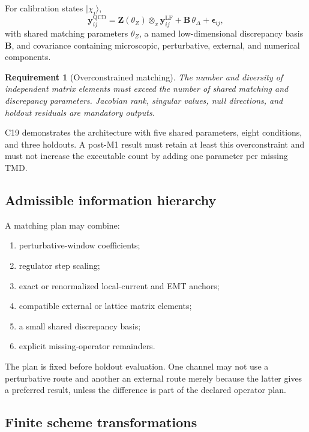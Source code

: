 \documentclass[11pt]{article}
\newtheorem{requirement}[definition]{Requirement}
\newcommand{\LF}{\mathrm{LF}}
\newcommand{\QCD}{\mathrm{QCD}}
\newcommand{\otimesx}{\mathbin{\otimes_x}}
\begin{document}
For calibration states \(|\chi_i\rangle\),
\begin{equation}
 \bm y_{ij}^{\QCD}
 =
 \bm Z(\theta_Z)
 \otimesx
 \bm y_{ij}^{\LF}
 +
 \bm B\,\theta_\Delta
 +
 \bm\epsilon_{ij},
 \label{eq:matching-fit}
\end{equation}
with shared matching parameters \(\theta_Z\), a named low-dimensional discrepancy basis \(\bm B\), and covariance containing microscopic, perturbative, external, and numerical components.

\begin{requirement}[Overconstrained matching]
The number and diversity of independent matrix elements must exceed the number of shared matching and discrepancy parameters.  Jacobian rank, singular values, null directions, and holdout residuals are mandatory outputs.
\end{requirement}

C19 demonstrates the architecture with five shared parameters, eight conditions, and three holdouts.  A post-M1 result must retain at least this overconstraint and must not increase the executable count by adding one parameter per missing TMD.

\subsection{Admissible information hierarchy}

A matching plan may combine:
\begin{enumerate}
\item perturbative-window coefficients;
\item regulator step scaling;
\item exact or renormalized local-current and EMT anchors;
\item compatible external or lattice matrix elements;
\item a small shared discrepancy basis;
\item explicit missing-operator remainders.
\end{enumerate}
The plan is fixed before holdout evaluation.  One channel may not use a perturbative route and another an external route merely because the latter gives a preferred result, unless the difference is part of the declared operator plan.

\subsection{Finite scheme transformations}
\end{document}
